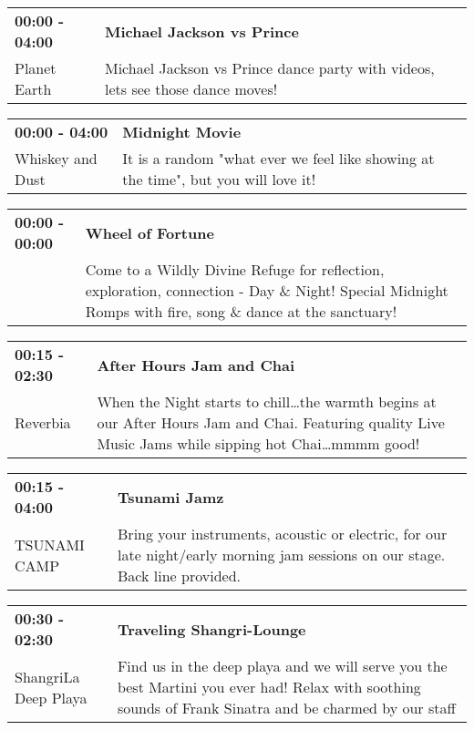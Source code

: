 \begin{tabular}{ p{1in} p{2.2in} }
    \textbf{00:00 - 04:00} & \textbf{Michael Jackson vs Prince} \\
    Planet Earth \newline  & Michael Jackson vs Prince dance party with videos, lets see those dance moves! \\
    \hline 
\end{tabular}
    
\begin{tabular}{ p{1in} p{2.2in} }
    \textbf{00:00 - 04:00} & \textbf{Midnight Movie} \\
    Whiskey and Dust \newline  & It is a random "what ever we feel like showing at the time", but you will love it! \\
    \hline 
\end{tabular}
    
\begin{tabular}{ p{1in} p{2.2in} }
    \textbf{00:00 - 00:00} & \textbf{Wheel of Fortune} \\
    ~ \newline  & Come to a Wildly Divine Refuge for reflection, exploration, connection - Day \& Night! Special Midnight Romps with fire, song \& dance at the sanctuary! \\
    \hline 
\end{tabular}
    
\begin{tabular}{ p{1in} p{2.2in} }
    \textbf{00:15 - 02:30} & \textbf{After Hours Jam and Chai} \\
    Reverbia \newline  & When the Night starts to chill\ldots the warmth begins at our After Hours Jam and Chai.  Featuring quality Live Music Jams while sipping hot Chai\ldots mmmm good! \\
    \hline 
\end{tabular}
    
\begin{tabular}{ p{1in} p{2.2in} }
    \textbf{00:15 - 04:00} & \textbf{Tsunami Jamz} \\
    TSUNAMI CAMP \newline  & Bring your instruments, acoustic or electric, for our late night/early morning jam sessions on our stage.  Back line provided. \\
    \hline 
\end{tabular}
    
\begin{tabular}{ p{1in} p{2.2in} }
    \textbf{00:30 - 02:30} & \textbf{Traveling Shangri-Lounge} \\
    ShangriLa \newline Deep Playa & Find us in the deep playa and we will serve you the best Martini you ever had! Relax with soothing sounds of Frank Sinatra and be charmed by our staff \\
    \hline 
\end{tabular}
    
